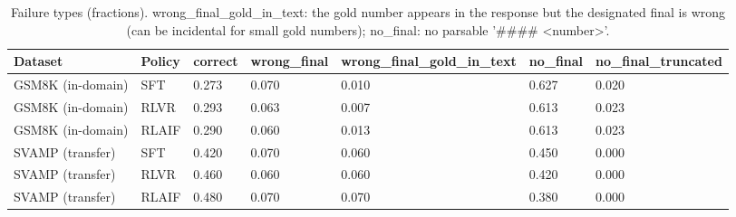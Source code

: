 \begin{table}[t]
\centering
\small
\caption{Failure types (fractions). wrong\_final\_gold\_in\_text: the gold number appears in the response but the designated final is wrong (can be incidental for small gold numbers); no\_final: no parsable '#### <number>'.}
\begin{tabular}{lllllll}
\toprule
Dataset & Policy & correct & wrong\_final & wrong\_final\_gold\_in\_text & no\_final & no\_final\_truncated \\
\midrule
GSM8K (in-domain) & SFT & 0.273 & 0.070 & 0.010 & 0.627 & 0.020 \\
GSM8K (in-domain) & RLVR & 0.293 & 0.063 & 0.007 & 0.613 & 0.023 \\
GSM8K (in-domain) & RLAIF & 0.290 & 0.060 & 0.013 & 0.613 & 0.023 \\
SVAMP (transfer) & SFT & 0.420 & 0.070 & 0.060 & 0.450 & 0.000 \\
SVAMP (transfer) & RLVR & 0.460 & 0.060 & 0.060 & 0.420 & 0.000 \\
SVAMP (transfer) & RLAIF & 0.480 & 0.070 & 0.070 & 0.380 & 0.000 \\
\bottomrule
\end{tabular}
\end{table}

